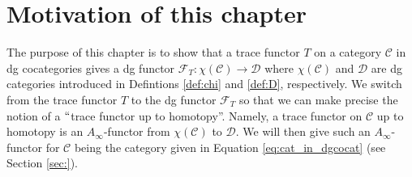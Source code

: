 \section{Motivation of this chapter}
The purpose of this chapter is to 
show that a trace functor $T$ on a 
category $\mathcal{C}$ in dg cocategories 
gives a dg functor $\mathcal{F}_T: 
\chi(\mathcal{C}) \to \mathcal{D}$ where 
$\chi(\mathcal{C})$ and 
$\mathcal{D}$ are dg categories 
introduced in Defintions \ref{def:chi} and 
\ref{def:D}, respectively. We switch from 
the trace functor $T$ to the dg functor 
$\mathcal{F}_T$ so that we can make 
precise the notion of a $``$trace 
functor up to homotopy''. Namely, a 
trace functor on $\mathcal{C}$ up to homotopy 
is an $A_\infty$-functor from 
$\chi(\mathcal{C})$ to $\mathcal{D}$. 
We will then give such an $A_\infty$-functor 
for $\mathcal{C}$ being the category 
given in Equation \ref{eq:cat_in_dgcocat} 
(see Section \ref{sec:}).